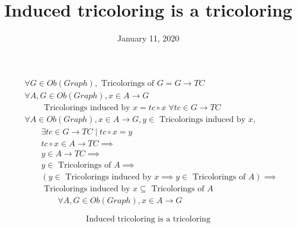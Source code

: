 \documentclass[fleqn, 11pt]{article}
\date{January 11, 2020}
\title{Induced tricoloring is a tricoloring}
\begin{document}

\begin{equation*}
\begin{aligned}
& \forall G \in Ob(Graph), \text{ Tricolorings of } G = G \rightarrow TC \\
& \forall A, G \in Ob(Graph), x \in A \rightarrow G \\
& \qquad \text{ Tricolorings induced by } x = tc \circ x \; 
    \forall tc \in G \rightarrow TC \\
& \forall A \in Ob(Graph), x \in A \rightarrow G, 
  y \in \text{ Tricolorings induced by } x, \\
& \qquad \exists tc \in G \rightarrow TC \mid tc \circ x = y \\
& \qquad tc \circ x \in A \rightarrow TC \implies \\
& \qquad y \in A \rightarrow TC \implies \\
& \qquad y \in \text{ Tricolorings of } A \implies \\
& \qquad (y \in \text{ Tricolorings induced by } x \implies
  y \in \text{ Tricolorings of } A) \implies \\
& \qquad \text{ Tricolorings induced by } x \subseteq
  \text{ Tricolorings of } A \\
& \qquad \qquad \forall A, G \in Ob(Graph), x \in A \rightarrow G
\end{aligned}
\end{equation*}

\hrulefill

$$ \text{ Induced tricoloring is a tricoloring } $$
\end{document}
